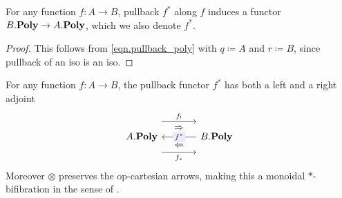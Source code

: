 \documentclass[Book-Poly]{subfiles}
\begin{document}
\begin{proposition}\label{prop.basechange}
For any function $f\colon A\to B$, pullback $f^*$ along $f$ induces a functor $\poly[B.]\to\poly[A.]$, which we also denote $f^*$.
\end{proposition}
\begin{proof}
This follows from \eqref{eqn.pullback_poly} with $q\coloneqq A$ and $r\coloneqq B$, since pullback of an iso is an iso.
\end{proof}

\begin{theorem}\label{thm.triple_adjoint_basechange}
For any function $f\colon A\to B$, the pullback functor $f^*$ has both a left and a right adjoint
\begin{equation}\label{eqn.adjoint_triple_monoidal_fib}
\begin{tikzcd}[column sep=large, background color=theoremcolor]
	\poly[A.]\ar[r, shift left=16pt, "f_!"]\ar[r, shift right=16pt, "f_*"']
	\ar[r, phantom, shift left=9pt, "\Rightarrow"]\ar[r, phantom, shift right=9pt, "\Leftarrow"]
&
	\poly[B.]\ar[l, "f^*" description]
\end{tikzcd}
\end{equation}
Moreover $\otimes$ preserves the op-cartesian arrows, making this a monoidal $*$-bifibration in the sense of \cite[Definition 12.1]{shulman2008framed}.
\end{theorem}
\end{document}
